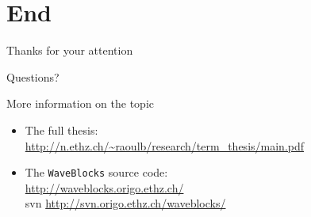 \documentclass{beamer}
\newcommand{\burl}[1]{\footnotesize{\url{#1}}}
\begin{document}
\section{End}


\begin{frame}{Thanks for your attention}
  \begin{center}
    Questions?    
  \end{center}
  \vspace{15pt}
  More information on the topic
  \begin{itemize}
    \item The full thesis:\\
    {\burl{http://n.ethz.ch/~raoulb/research/term_thesis/main.pdf}}
    \item The \texttt{WaveBlocks} source code:\\
    {\burl{http://waveblocks.origo.ethz.ch/}} \\
    {svn \burl{http://svn.origo.ethz.ch/waveblocks/}}
  \end{itemize}
\end{frame}
\end{document}
